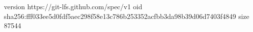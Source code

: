 version https://git-lfs.github.com/spec/v1
oid sha256:fff033ee5d0fdf5aec298f58e13c786b253352acfbb3da98b39d06d7403f4849
size 87544
